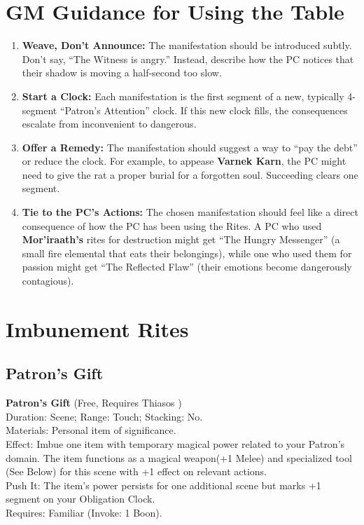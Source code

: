 \documentclass[12pt,twoside]{book}
\begin{document}
\section*{GM Guidance for Using the Table}

\begin{enumerate}
    \item \textbf{Weave, Don't Announce:} The manifestation should be introduced subtly. Don't say, ``The Witness is angry.'' Instead, describe how the PC notices that their shadow is moving a half-second too slow.

    \item \textbf{Start a Clock:} Each manifestation is the first segment of a new, typically 4-segment ``Patron's Attention'' clock. If this new clock fills, the consequences escalate from inconvenient to dangerous.

    \item \textbf{Offer a Remedy:} The manifestation should suggest a way to ``pay the debt'' or reduce the clock. For example, to appease \textbf{Varnek Karn}, the PC might need to give the rat a proper burial for a forgotten soul. Succeeding clears one segment.

    \item \textbf{Tie to the PC's Actions:} The chosen manifestation should feel like a direct consequence of how the PC has been using the Rites. A PC who used \textbf{Mor'iraath's} rites for destruction might get ``The Hungry Messenger'' (a small fire elemental that eats their belongings), while one who used them for passion might get ``The Reflected Flaw'' (their emotions become dangerously contagious).
\end{enumerate}

\section*{Imbunement Rites}

\subsection*{Patron's Gift}
\textbf{Patron's Gift} (Free, Requires Thiasos )\\
Duration: Scene; Range: Touch; Stacking: No.\\
Materials: Personal item of significance.\\
Effect: Imbue one item with temporary magical power related to your Patron's domain. The item functions as a magical weapon(+1 Melee) and specialized tool (See Below) for this scene with +1 effect on relevant actions.\\
Push It: The item's power persists for one additional scene but marks +1 segment on your Obligation Clock.\\
Requires: Familiar (Invoke: 1 Boon).
\end{document}
